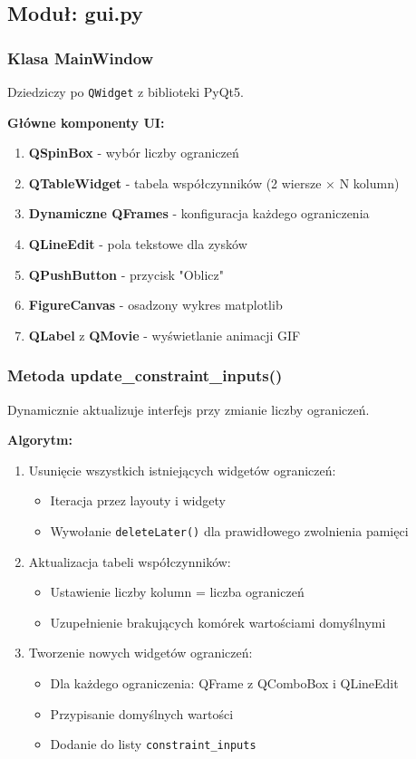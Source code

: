 \documentclass[12pt,a4paper]{article}
\begin{document}
\begin{enumerate}
\subsection{Moduł: gui.py}

\subsubsection{Klasa MainWindow}

Dziedziczy po \texttt{QWidget} z biblioteki PyQt5.

\textbf{Główne komponenty UI:}
\begin{enumerate}
    \item \textbf{QSpinBox} - wybór liczby ograniczeń
    \item \textbf{QTableWidget} - tabela współczynników (2 wiersze × N kolumn)
    \item \textbf{Dynamiczne QFrames} - konfiguracja każdego ograniczenia
    \item \textbf{QLineEdit} - pola tekstowe dla zysków
    \item \textbf{QPushButton} - przycisk "Oblicz"
    \item \textbf{FigureCanvas} - osadzony wykres matplotlib
    \item \textbf{QLabel} z \textbf{QMovie} - wyświetlanie animacji GIF
\end{enumerate}

\subsubsection{Metoda update\_constraint\_inputs()}

Dynamicznie aktualizuje interfejs przy zmianie liczby ograniczeń.

\textbf{Algorytm:}
\begin{enumerate}
    \item Usunięcie wszystkich istniejących widgetów ograniczeń:
    \begin{itemize}
        \item Iteracja przez layouty i widgety
        \item Wywołanie \texttt{deleteLater()} dla prawidłowego zwolnienia pamięci
    \end{itemize}
    \item Aktualizacja tabeli współczynników:
    \begin{itemize}
        \item Ustawienie liczby kolumn = liczba ograniczeń
        \item Uzupełnienie brakujących komórek wartościami domyślnymi
    \end{itemize}
    \item Tworzenie nowych widgetów ograniczeń:
    \begin{itemize}
        \item Dla każdego ograniczenia: QFrame z QComboBox i QLineEdit
        \item Przypisanie domyślnych wartości
        \item Dodanie do listy \texttt{constraint\_inputs}
    \end{itemize}
\end{enumerate}


\end{enumerate}
\end{document}
